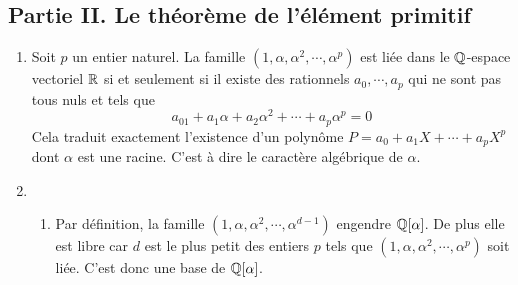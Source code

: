 \subsection*{Partie II. Le théorème de l'élément primitif}
\begin{enumerate}
 \item Soit $p$ un entier naturel. La famille $(1,\alpha,\alpha^2,\cdots,\alpha^p)$ est liée dans le $\mathbb{Q}$-espace vectoriel $\mathbb{R}$ si et seulement si il existe des rationnels $a_0,\cdots,a_p$ qui ne sont pas tous nuls et tels que
\begin{displaymath}
 a_01 + a_1\alpha + a_2\alpha^2 + \cdots + a_p\alpha^p =0
\end{displaymath}
Cela traduit exactement l'existence d'un polynôme $P=a_0+a_1X+\cdots+a_pX^p$ dont $\alpha$ est une racine. C'est à dire le caractère algébrique de $\alpha$.
\item \begin{enumerate}
 \item Par définition, la famille $(1,\alpha,\alpha^2,\cdots,\alpha^{d-1})$ engendre $\mathbb{Q}[\alpha]$. De plus elle est libre car $d$ est le plus petit des entiers $p$ tels que $(1,\alpha,\alpha^2,\cdots,\alpha^p)$ soit liée. C'est donc une base de $\mathbb{Q}[\alpha]$.


\end{enumerate}
\end{enumerate}
